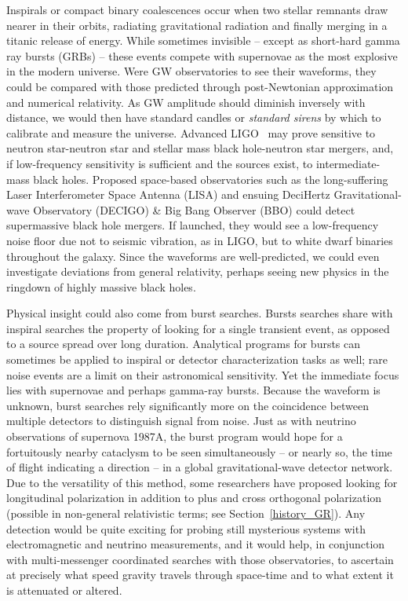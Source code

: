 Inspirals or compact binary coalescences occur when two stellar remnants draw nearer in their orbits, radiating gravitational radiation and finally merging in a titanic release of energy. 
While sometimes invisible -- except as short-hard gamma ray bursts (GRBs) -- these events compete with supernovae as the most explosive in the modern universe. 
Were GW observatories to see their waveforms, they could be compared with those predicted through post-Newtonian approximation and numerical relativity. 
As GW amplitude should diminish inversely with distance, we would then have standard candles or \textit{standard sirens} by which to calibrate and measure the universe. 
Advanced LIGO~\cite{aLIGOrefDesign,aLIGOsysDesign} may prove sensitive to neutron star-neutron star and stellar mass black hole-neutron star mergers, and, if low-frequency sensitivity is sufficient and the sources exist, to intermediate-mass black holes. 
Proposed space-based observatories such as the long-suffering Laser Interferometer Space Antenna (LISA) and ensuing DeciHertz Gravitational-wave Observatory (DECIGO) \& Big Bang Observer (BBO) could detect supermassive black hole mergers. If launched, they would see a low-frequency noise floor due not to seismic vibration, as in LIGO, but to white dwarf binaries throughout the galaxy. 
Since the waveforms are well-predicted, we could even investigate deviations from general relativity, perhaps seeing new physics in the ringdown of highly massive black holes.

Physical insight could also come from burst searches. 
Bursts searches share with inspiral searches the property of looking for a single transient event, as opposed to a source spread over long duration. 
Analytical programs for bursts can sometimes be applied to inspiral or detector characterization tasks as well; rare noise events are a limit on their astronomical sensitivity.
Yet the immediate focus lies with supernovae and perhaps gamma-ray bursts. 
Because the waveform is unknown, burst searches rely significantly more on the coincidence between multiple detectors to distinguish signal from noise. 
Just as with neutrino observations of supernova 1987A, the burst program would hope for a fortuitously nearby cataclysm to be seen simultaneously -- or nearly so, the time of flight indicating a direction -- in a global gravitational-wave detector network. 
Due to the versatility of this method, some researchers have proposed looking for longitudinal polarization in addition to plus and cross orthogonal polarization (possible in non-general relativistic terms; see Section~\ref{history_GR}). 
Any detection would be quite exciting for probing still mysterious systems with electromagnetic and neutrino measurements, and it would help, in conjunction with multi-messenger coordinated searches with those observatories, to ascertain at precisely what speed gravity travels through space-time and to what extent it is attenuated or altered.

